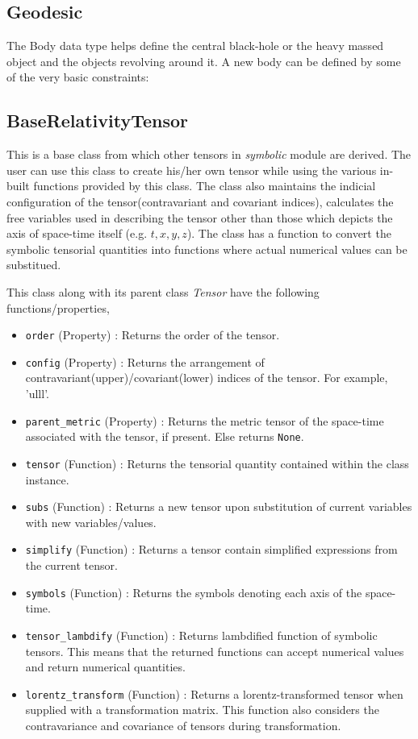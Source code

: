 \documentclass{aastex63}
\begin{document}
\subsection{Geodesic} \label{subsec:Geodesic}
The Body data type helps define the central black-hole or the heavy massed object and the objects revolving around it. A new body can be defined by some of the very basic constraints:

\subsection{BaseRelativityTensor} \label{subsec:BaseRelativityTensor}
This is a base class from which other tensors in \textit{symbolic} module are derived. The user can use this class to create his/her own tensor while using the various in-built functions provided by this class. The class also maintains the indicial configuration of the tensor(contravariant and covariant indices), calculates the free variables used in describing the tensor other than those which depicts the axis of space-time itself (e.g. $t, x, y, z$). The class has a function to convert the symbolic tensorial quantities into functions where actual numerical values can be substitued.

This class along with its parent class \textit{Tensor} have the following functions/properties,
\begin{itemize}
\item \texttt{order} (Property) : Returns the order of the tensor. 
\item \texttt{config} (Property) : Returns the arrangement of contravariant(upper)/covariant(lower) indices of the tensor. For example, 'ulll'.
\item \texttt{parent\_metric} (Property) : Returns the metric tensor of the space-time associated with the tensor, if present. Else returns \texttt{None}.
\item \texttt{tensor} (Function) : Returns the tensorial quantity contained within the class instance.
\item \texttt{subs} (Function) : Returns a new tensor upon substitution of current variables with new variables/values.
\item \texttt{simplify} (Function) : Returns a tensor contain simplified expressions from the current tensor.
\item \texttt{symbols} (Function) : Returns the symbols denoting each axis of the space-time.
\item \texttt{tensor\_lambdify} (Function) : Returns lambdified function of symbolic tensors. This means that the returned functions can accept numerical values and return numerical quantities.
\item \texttt{lorentz\_transform} (Function) : Returns a lorentz-transformed tensor when supplied with a transformation matrix. This function also considers the contravariance and covariance of tensors during transformation.
\end{itemize}
\end{document}
